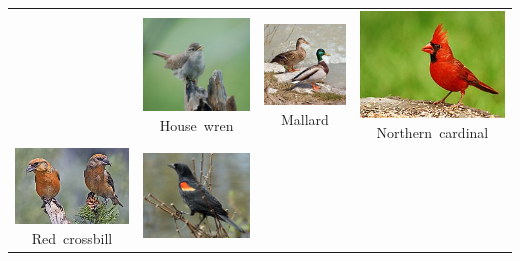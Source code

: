 \documentclass{beamer}
\begin{document}
\begin{frame}
{\begin{tabular}{cccc}
        & 
        \vbox{%
            \hbox{\includegraphics[width=\picwidth]{images/houwre.jpg}}
            \hbox{\tiny House wren}}
        &
        \vbox{%
            \hbox{\includegraphics[width=\picwidth]{images/mallar3.jpg}}
            \hbox{\tiny Mallard}}
        & 
        \vbox{%
            \hbox{\includegraphics[width=\picwidth]{images/norcar.jpg}}
            \hbox{\tiny Northern cardinal}}
            \\
        \vbox{%
            \hbox{\includegraphics[width=\picwidth]{images/redcro.jpg}}
            \hbox{\tiny Red crossbill}}
        & 
        \vbox{%
            \hbox{\includegraphics[width=\picwidth]{images/rewbla.jpg}}
}
\end{tabular}}
\end{frame}
\end{document}
